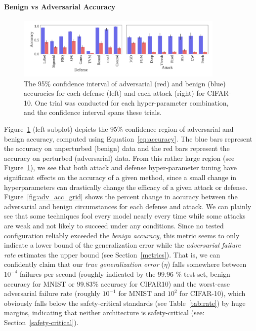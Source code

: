 \documentclass[journal]{IEEEtran}
\begin{document}
\paragraph{Benign vs Adversarial Accuracy}

\begin{figure}[!hptb]
    {\centering
    \includegraphics[trim={0 0.85em 0 0.4em},clip,width=0.9\textwidth]{Fig12.pdf}
    \vspace{-1em}
    \caption{The 95\% confidence interval of adversarial (red) and benign (blue) accuracies for each defense (left) and each attack (right) for CIFAR-10. One trial was conducted for each hyper-parameter combination, and the confidence interval spans these trials.}
    \label{fig:acc}
    } %
\end{figure}

Figure~\ref{fig:acc} (left subplot) depicts the 95\% confidence region of adversarial and benign accuracy, computed using Equation~\ref{eq:accuracy}. The blue bars represent the accuracy on unperturbed (benign) data and the red bars represent the accuracy on perturbed (adversarial) data. From this rather large region (see Figure~\ref{fig:acc}), we see that both attack and defense hyper-parameter tuning have significant effects on the accuracy of a given method, since a small change in hyperparameters can drastically change the efficacy of a given attack or defense. Figure~\ref{fig:adv_acc_grid} shows the percent change in accuracy between the adversarial and benign circumstances for each defense and attack. We can plainly see that some techniques fool every model nearly every time while some attacks are weak and not likely to succeed under any conditions. Since no tested configuration reliably exceeded the \textit{benign accuracy}, this metric seems to only indicate a lower bound of the generalization error while the \textit{adversarial failure rate} estimates the upper bound (see Section~\ref{metrics}). That is, we can confidently claim that our \textit{true generalization error} ($\eta$) falls somewhere between $10^{-4}$ failures per second (roughly indicated by the 99.96 \% test-set, benign accuracy for MNIST or 99.83\% accuracy for CIFAR10) and the worst-case adversarial failure rate  (roughly $10^{-1}$ for MNIST and $10^{2}$ for CIFAR-10), which obviously falls below the safety-critical standards (see Table~\ref{tab:rate}) by huge margins, indicating that neither architecture is safety-critical (see: Section~\ref{safety-critical}).
\end{document}
